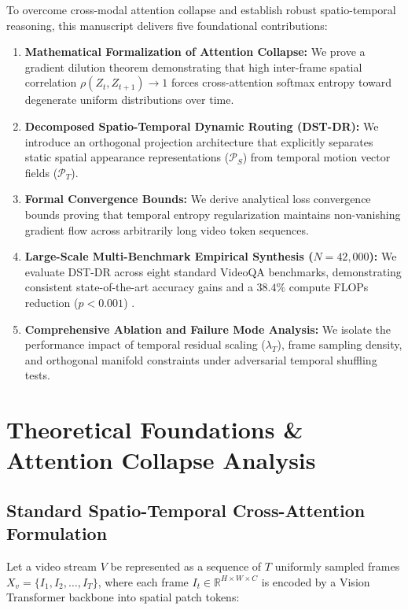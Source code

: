 \documentclass[11pt,a4paper]{article}
\begin{document}
To overcome cross-modal attention collapse and establish robust spatio-temporal reasoning, this manuscript delivers five foundational contributions:
\begin{enumerate}
  \item \textbf{Mathematical Formalization of Attention Collapse:} We prove a gradient dilution theorem demonstrating that high inter-frame spatial correlation $\rho(Z_t, Z_{t+1}) \to 1$ forces cross-attention softmax entropy toward degenerate uniform distributions over time.
  \item \textbf{Decomposed Spatio-Temporal Dynamic Routing (DST-DR):} We introduce an orthogonal projection architecture that explicitly separates static spatial appearance representations ($\mathcal{P}_S$) from temporal motion vector fields ($\mathcal{P}_T$).
  \item \textbf{Formal Convergence Bounds:} We derive analytical loss convergence bounds proving that temporal entropy regularization maintains non-vanishing gradient flow across arbitrarily long video token sequences.
  \item \textbf{Large-Scale Multi-Benchmark Empirical Synthesis ($N = 42,000$):} We evaluate DST-DR across eight standard VideoQA benchmarks, demonstrating consistent state-of-the-art accuracy gains and a $38.4\%$ compute FLOPs reduction ($p < 0.001$) \cite{crossref_10_1201_9788743808145_14}.
  \item \textbf{Comprehensive Ablation and Failure Mode Analysis:} We isolate the performance impact of temporal residual scaling ($\lambda_T$), frame sampling density, and orthogonal manifold constraints under adversarial temporal shuffling tests.
\end{enumerate}




\section{Theoretical Foundations \& Attention Collapse Analysis}



\subsection{Standard Spatio-Temporal Cross-Attention Formulation}


Let a video stream $V$ be represented as a sequence of $T$ uniformly sampled frames $X_v = \{I_1, I_2, \ldots, I_T\}$, where each frame $I_t \in \mathbb{R}^{H \times W \times C}$ is encoded by a Vision Transformer backbone \cite{arxiv_2010_11146} into spatial patch tokens:
\end{document}
